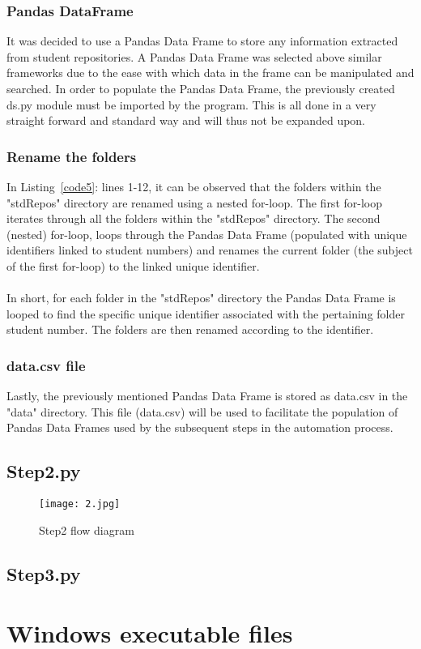 \subsubsection{Pandas DataFrame}
\label{datFra}
It was decided to use a Pandas Data Frame to store any information extracted from student repositories. A Pandas Data Frame was selected above similar frameworks due to the ease with which data in the frame can be manipulated and searched. In order to populate the Pandas Data Frame, the previously created ds.py module must be imported by the program. This is all done in a very straight forward and standard way and will thus not be expanded upon.  


\subsubsection{Rename the folders}
\label{renFol}


In Listing~\ref{code5}: lines 1-12, it can be observed that the folders within the "stdRepos" directory are renamed using a nested for-loop. The first for-loop iterates through all the folders within the "stdRepos" directory. The second (nested) for-loop, loops through the Pandas Data Frame (populated with unique identifiers linked to student numbers) and renames the current folder (the subject of the first for-loop) to the linked unique identifier.
\\\\
In short, for each folder in the "stdRepos" directory the Pandas Data Frame is looped to find the specific unique identifier associated with the pertaining folder student number. The folders are then renamed according to the identifier. 


\subsubsection{data.csv file}
\label{data.csv}
Lastly, the previously mentioned Pandas Data Frame is stored as data.csv in the "data" directory. This file (data.csv) will be used to facilitate the population of Pandas Data Frames used by the subsequent steps in the automation process. 



\subsection{Step2.py}
\label{step2}

\begin{figure}[H]
\begin{center}
\texttt{[image: 2.jpg]}
\caption{Step2 flow diagram}
\label{2}
\end{center}
\end{figure}

\subsection{Step3.py}
\label{step3}

\section{Windows executable files}
\label{exe}
